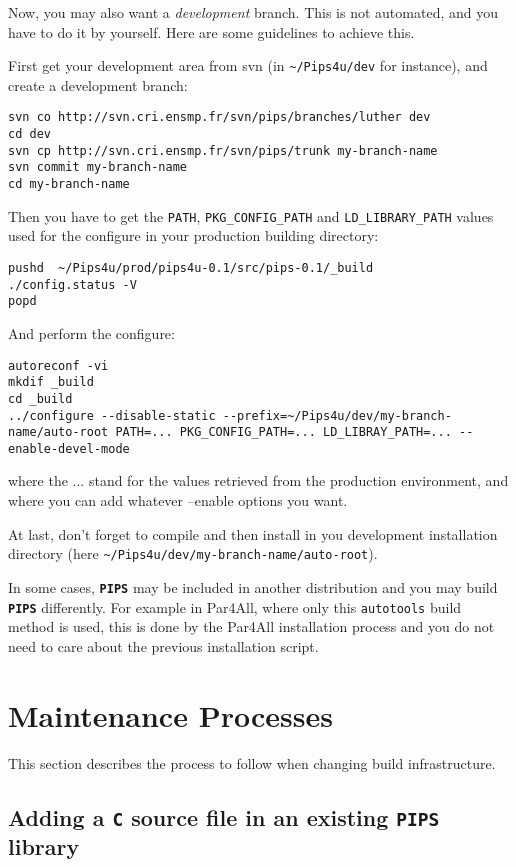 \documentclass[a4paper]{article}
\newcommand{\PIPS}{\textbf{\texttt{PIPS}}}
\begin{document}
Now, you may also want a \emph{development} branch. This is not automated,
and you have to do it by yourself. Here are some guidelines to achieve
this.

First get your development area from svn (in \lstinline|~/Pips4u/dev|
for instance), and create a development branch:
\begin{lstlisting}
svn co http://svn.cri.ensmp.fr/svn/pips/branches/luther dev
cd dev
svn cp http://svn.cri.ensmp.fr/svn/pips/trunk my-branch-name
svn commit my-branch-name
cd my-branch-name
\end{lstlisting}
Then you have to get the \lstinline|PATH|, \lstinline|PKG_CONFIG_PATH|
and \lstinline|LD_LIBRARY_PATH| values used for the configure
in your production building directory:
\begin{lstlisting}
pushd  ~/Pips4u/prod/pips4u-0.1/src/pips-0.1/_build
./config.status -V
popd
\end{lstlisting}
And perform the configure:
\begin{lstlisting}
autoreconf -vi
mkdif _build
cd _build
../configure --disable-static --prefix=~/Pips4u/dev/my-branch-name/auto-root PATH=... PKG_CONFIG_PATH=... LD_LIBRAY_PATH=... --enable-devel-mode
\end{lstlisting}
where the ... stand for the values retrieved from the production
environment, and where you can add whatever --enable options you want.

At last, don't forget to compile and then install in you development
installation directory (here
\lstinline|~/Pips4u/dev/my-branch-name/auto-root|).

In some cases, \PIPS{} may be included in another distribution and you may
build \PIPS{} differently. For example in Par4All, where only this
\texttt{autotools} build method is used, this is done by the Par4All
installation process and you do not need to care about the previous
installation script.

\section{Maintenance Processes}
\label{sec:maintain}

This section describes the process to follow when changing build infrastructure.

\subsection{Adding a \texttt{C} source file in an existing \PIPS{} library}
\end{document}
